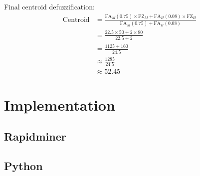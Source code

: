 \documentclass[12pt,a4paper]{article}
\begin{document}
Final centroid defuzzification:
\begin{align}
    \text{Centroid} &= \frac{\text{FA}_M(0.75) \times \text{FZ}_M + \text{FA}_H(0.08) \times \text{FZ}_H}{\text{FA}_M(0.75) + \text{FA}_H(0.08)} \\
    &= \frac{22.5 \times 50 + 2 \times 80}{22.5 + 2} \\
    &= \frac{1125 + 160}{24.5} \\
    &\approx \frac{1285}{24.5} \\
    &\approx 52.45
\end{align}

\section{Implementation}

\subsection{Rapidminer}

\subsection{Python}
\end{document}
